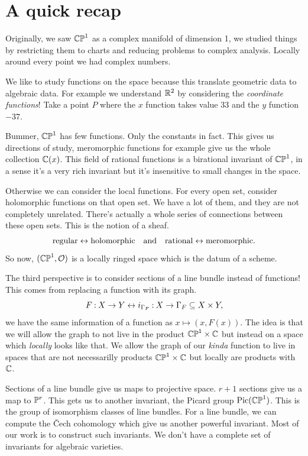 \documentclass[12pt]{memoir}
\begin{document}
\section{A quick recap}

Originally, we saw $\mathbb{CP}^1$ as a complex manifold of dimension 1, we studied things by restricting them to charts and reducing problems to complex analysis. Locally around every point we had complex numbers.\par
We like to study functions on the space because this translate geometric data to algebraic data. For example we understand $\mathbb{R}^2$ by considering the \emph{coordinate functions}! Take a point $P$ where the $x$ function takes value $33$ and the $y$ function $-37$.\par
Bummer, $\mathbb{CP}^1$ has few functions. Only the constants in fact. This gives us directions of study, meromorphic functions for example give us the whole collection $\mathbb{C}(x)$. This field of rational functions is a birational invariant of $\mathbb{CP}^1$, in a sense it's a very rich invariant but it's insensitive to small changes in the space.\par
Otherwise we can consider the local functions. For every open set, consider holomorphic functions on that open set. We have a lot of them, and they are not completely unrelated. There's actually a whole series of connections between these open sets. This is the notion of a sheaf. 
$$\text{regular}\leftrightarrow\text{holomorphic}\quad\text{and}\quad\text{rational}\leftrightarrow\text{meromorphic}.$$
So now, $(\mathbb{CP}^1,\mathcal{O})$ is a locally ringed space which is the datum of a scheme.\par
The third perspective is to consider sections of a line bundle instead of functions! This comes from replacing a function with its graph.
$$F\mathbin{:}X\to Y\leftrightarrow i_{\Gamma_F}\mathbin{:} X\to\Gamma_F\subseteq X\times Y,$$
we have the same information of a function as $x\mapsto(x,F(x))$. The idea is that we will allow the graph to not live in the product $\mathbb{CP}^1\times\mathbb{C}$ but instead on a space which \emph{locally} looks like that. We allow the graph of our \emph{kinda} function to live in spaces that are not necessarilly products $\mathbb{CP}^1\times\mathbb{C}$ but locally are products with $\mathbb{C}$.\par
Sections of a line bundle give us maps to projective space. $r+1$ sections give us a map to $\mathbb{P}^r$. This gets us to another invariant, the Picard group $\operatorname{Pic}(\mathbb{CP}^1)$. This is the group of isomorphism classes of line bundles. For a line bundle, we can compute the \v{C}ech cohomology which give us another powerful invariant. Most of our work is to construct such invariants. We don't have a complete set of invariants for algebraic varieties.
\end{document}
